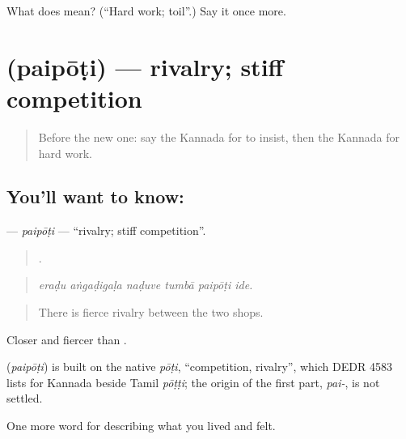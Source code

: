 \begin{tcolorbox}[breakable,colback=teal!4,colframe=teal!35!black,title={Before you move on}]
What does  mean? (\textquotedblleft{}Hard work; toil\textquotedblright{}.) Say it once more.
\end{tcolorbox}
\section[\texorpdfstring{\kn{ಪೈಪೋಟಿ} (paipōṭi)}{ಪೈಪೋಟಿ (paipōṭi)}]{ (paipōṭi) — rivalry; stiff competition}

\label{lesson:KA-C521-paipoti}



\begin{quote}
Before the new one: say the Kannada for to insist, then the Kannada for hard work.
\end{quote}

\subsection*{You'll want to know: }
\textbf{} — \emph{paipōṭi} — \textquotedblleft{}rivalry; stiff competition\textquotedblright{}.

\begin{quote}
     .
\end{quote}

\begin{quote}
\emph{eraḍu aṅgaḍigaḷa naḍuve tumbā paipōṭi ide.}
\end{quote}

\begin{quote}
There is fierce rivalry between the two shops.
\end{quote}

Closer and fiercer than .

\begin{cousinweb}
\textbf{} (\emph{paipōṭi}) is built on the native \emph{pōṭi}, \textquotedblleft{}competition, rivalry\textquotedblright{}, which DEDR 4583 lists for Kannada beside Tamil \emph{pōṭṭi}; the origin of the first part, \emph{pai-}, is not settled.
\end{cousinweb}

\begin{grammarlens}[title={What you've built}]
One more word for describing what you lived and felt.
\end{grammarlens}

